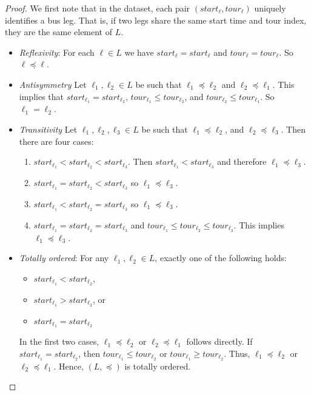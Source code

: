 \documentclass[10pt,a4paper]{amsart}
\newcommand{\param}{\mathit}
\begin{document}
\begin{proof}We first note that in the dataset, each pair $(\param{start}_\ell,\param{tour}_\ell)$ uniquely identifies a bus leg. That is, if two legs share the same start time and tour index, they are the same element of $L$.
\begin{itemize}
        \item \textit{Reflexivity}: For each $\ell \in L$ we have $\param{start}_{\ell}=\param{start}_{\ell}$ and $\param{tour}_{\ell}  = \param{tour}_{\ell}$. So $\ell \preceq \ell $.
   \item  \textit{Antisymmetry} Let $\ell_1,\ell_2 \in L$ be such that $\ell_1\preceq \ell_2$ and $\ell_2\preceq \ell_1$. This implies that $\param{start}_{\ell_1}=\param{start}_{\ell_2}$, $\param{tour}_{\ell_1}  \le \param{tour}_{\ell_2}$, and $\param{tour}_{\ell_2}  \le \param{tour}_{\ell_1}$. So $\ell_1 = \ell_2$.
   \item \textit{Transitivity} Let $\ell_1,\ell_2, \ell_3 \in L$ be such that  $\ell_1 \preceq \ell_2$, and $\ell_2 \preceq \ell_3$. Then there are four cases:
   \begin{enumerate}
       \item  $\param{start}_{\ell_1} <\param{start}_{\ell_2}<\param{start}_{\ell_3}$. Then $\param{start}_{\ell_1} < \param{start}_{\ell_3}$ and therefore $\ell_1 \preceq \ell_3$.
       \item  $\param{start}_{\ell_1} =\param{start}_{\ell_2}<\param{start}_{\ell_3}$ so $\ell_1 \preceq \ell_3$.
              \item  $\param{start}_{\ell_1} <\param{start}_{\ell_2}=\param{start}_{\ell_3}$ so $\ell_1 \preceq \ell_3$.
       
       \item $\param{start}_{\ell_1} =\param{start}_{\ell_2}=\param{start}_{\ell_3}$ and $\param{tour}_{\ell_1}\le \param{tour}_{\ell_2} \le \param{tour}_{\ell_3}$. This implies $\ell_1 \preceq \ell_3$.
   \end{enumerate}
   \item \textit{Totally ordered}: For any $\ell_1, \ell_2 \in L$, exactly one of the following holds:  
   \begin{itemize}
       \item   $\param{start}_{\ell_1} < \param{start}_{\ell_2}$,  
   \item  $\param{start}_{\ell_1} > \param{start}_{\ell_2}$, or  
   \item $\param{start}_{\ell_1} = \param{start}_{\ell_2}$
   \end{itemize}
   In the first two cases, $\ell_1 \preceq \ell_2$ or $\ell_2 \preceq \ell_1$ follows directly.  If $\param{start}_{\ell_1} = \param{start}_{\ell_2}$, then $\param{tour}_{\ell_1} \leq \param{tour}_{\ell_2}$ or $\param{tour}_{\ell_1} \geq \param{tour}_{\ell_2}$. Thus, $\ell_1 \preceq \ell_2$ or $\ell_2 \preceq \ell_1$.  
   Hence, $(L, \preceq)$ is totally ordered.
 \qedhere
    \end{itemize}
\end{proof}
\end{document}
